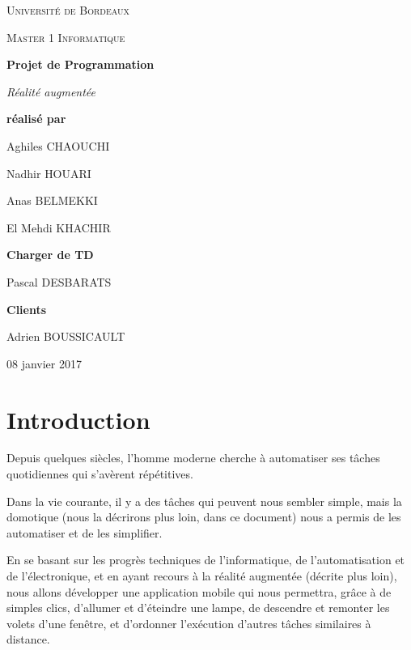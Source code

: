 \documentclass[12pt,a4paper]{article}
\begin{document}
\begin{titlepage}
\centering
{\scshape\LARGE Université de Bordeaux \par}
{\scshape\Large Master 1 Informatique \par}
\vspace{3cm}

{\Huge\bfseries Projet de Programmation \par}%
\vspace{0.5cm}
{\Large\itshape Réalité augmentée \par}

\vfill
{\bfseries réalisé par} \par
Aghiles \textsc{CHAOUCHI} \par
Nadhir \textsc{HOUARI} \par
Anas \textsc{BELMEKKI} \par
El Mehdi \textsc{KHACHIR} \par \par
{\bfseries Charger de TD} \par
Pascal \textsc{DESBARATS} \par \par
{\bfseries Clients} \par
Adrien \textsc{BOUSSICAULT} \par
\vfill

{\large 08 janvier 2017\par}

\end{titlepage}
\tableofcontents
\newpage
\section{Introduction}

Depuis quelques siècles, l'homme moderne cherche à automatiser ses tâches quotidiennes qui s'avèrent répétitives.\par

Dans la vie courante, il y a des tâches qui peuvent nous sembler simple, mais la domotique (nous la décrirons plus loin, dans ce document) nous a permis de les automatiser et de les simplifier.\par

En se basant sur les progrès techniques de l'informatique, de l'automatisation et de l'électronique, et en ayant recours à la réalité augmentée (décrite plus loin), nous allons développer une application mobile qui nous permettra, grâce à de simples clics, d'allumer et d'éteindre une lampe, de descendre et remonter les volets d'une fenêtre, et d'ordonner l'exécution d'autres tâches similaires à distance.
\end{document}
